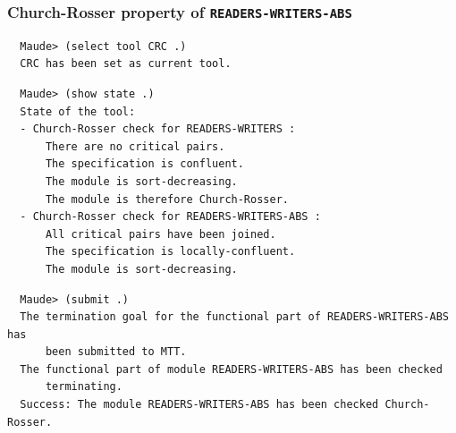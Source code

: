 \documentclass[xcolor=dvipsnames,10pt]{beamer}
\begin{document}
\begin{frame}[fragile]
  \frametitle{Church-Rosser property of \verb~READERS-WRITERS-ABS~}

\begin{scriptsize}
\begin{verbatim}
  Maude> (select tool CRC .)
  CRC has been set as current tool.
\end{verbatim}
\end{scriptsize}

\begin{scriptsize}
\begin{verbatim}
  Maude> (show state .)
  State of the tool:
  - Church-Rosser check for READERS-WRITERS :
      There are no critical pairs.
      The specification is confluent.
      The module is sort-decreasing.
      The module is therefore Church-Rosser.
  - Church-Rosser check for READERS-WRITERS-ABS :
      All critical pairs have been joined.
      The specification is locally-confluent.
      The module is sort-decreasing.
\end{verbatim}
\end{scriptsize}

\begin{scriptsize}
\begin{verbatim}
  Maude> (submit .)
  The termination goal for the functional part of READERS-WRITERS-ABS has
      been submitted to MTT.
  The functional part of module READERS-WRITERS-ABS has been checked 
      terminating.
  Success: The module READERS-WRITERS-ABS has been checked Church-Rosser.
\end{verbatim}
\end{scriptsize}

\end{frame}
\end{document}
